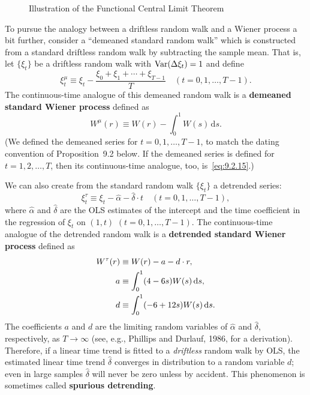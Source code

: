 \begin{figure}[htbp]
\centering
{}
\caption{Illustration of the Functional Central Limit Theorem}
\label{fig:9.2}
\end{figure}

To pursue the analogy between a driftless random walk and a Wiener process
a bit further, consider a ``demeaned standard random walk'' which is constructed
from a standard driftless random walk by subtracting the sample mean. That is, let
$\{\xi_t\}$ be a driftless random walk with $\operatorname{Var}(\Delta \xi_t) = 1$ and define
\begin{equation}
\label{eq:9.2.14}
\xi_t^\mu \equiv \xi_t - \frac{\xi_0 + \xi_1 + \cdots + \xi_{T-1}}{T}
\quad (t = 0, 1, \ldots, T-1).
\end{equation}
The continuous-time analogue of this demeaned random walk is a \textbf{demeaned standard Wiener process} defined as
\begin{equation}
\label{eq:9.2.15}
W^\mu(r) \equiv W(r) - \int_0^1 W(s)\,\mathrm{d}s.
\end{equation}
(We defined the demeaned series for $t = 0, 1, \ldots, T-1$, to match the dating
convention of Proposition~9.2 below. If the demeaned series is defined for $t =
1, 2, \ldots, T$, then its continuous-time analogue, too, is~\eqref{eq:9.2.15}.)

We can also create from the standard random walk $\{\xi_t\}$ a detrended series:
\begin{equation}
\label{eq:9.2.16}
\xi_t^\tau \equiv \xi_t - \hat{\alpha} - \hat{\delta} \cdot t
\quad (t = 0, 1, \ldots, T-1),
\end{equation}
where $\hat{\alpha}$ and $\hat{\delta}$ are the OLS estimates of the intercept and the time coefficient in the
regression of $\xi_t$ on $(1, t)$ $(t = 0, 1, \ldots, T-1)$. The continuous-time analogue of
the detrended random walk is a \textbf{detrended standard Wiener process} defined as
\begin{align}
W^\tau(r) &\equiv W(r) - a - d \cdot r, \notag \\
a &\equiv \int_0^1 (4 - 6s) W(s)\,\mathrm{d}s, \notag \\
d &\equiv \int_0^1 (-6 + 12s) W(s)\,\mathrm{d}s.
\label{eq:9.2.17}
\end{align}
The coefficients $a$ and $d$ are the limiting random variables of $\hat{\alpha}$ and $\hat{\delta}$, respectively,
as $T \to \infty$ (see, e.g., Phillips and Durlauf, 1986, for a derivation). Therefore,
if a linear time trend is fitted to a \emph{driftless} random walk by OLS, the estimated
linear time trend $\hat{\delta}$ converges in distribution to a random variable $d$; even in large
samples $\hat{\delta}$ will never be zero unless by accident. This phenomenon is sometimes
called \textbf{spurious detrending}.

